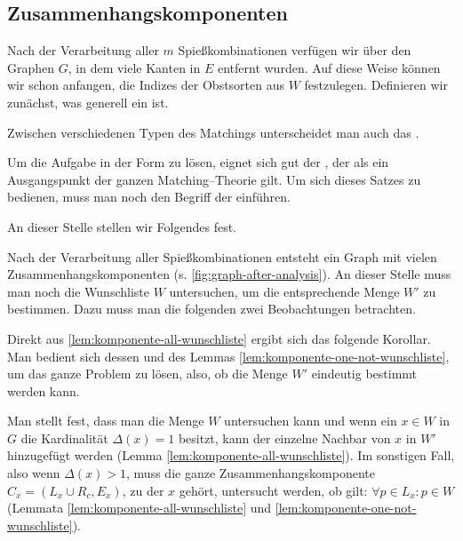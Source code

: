 \subsection{Zusammenhangskomponenten}
Nach der Verarbeitung aller $m$ Spießkombinationen verfügen wir über den Graphen $G$,
in dem viele Kanten in $E$ entfernt wurden.
Auf diese Weise können wir schon anfangen, die Indizes der Obstsorten aus $W$ festzulegen.
Definieren wir zunächst, was generell ein  ist.



Zwischen verschiedenen Typen des Matchings unterscheidet man auch das .



Um die Aufgabe in der Form zu lösen, eignet sich gut der ,
der als ein Ausgangspunkt der ganzen Matching--Theorie gilt. 
Um sich dieses Satzes zu bedienen, muss man noch den Begriff der  einführen.





An dieser Stelle stellen wir Folgendes fest.







Nach der Verarbeitung aller Spießkombinationen entsteht ein Graph mit vielen Zusammenhangskomponenten
(s. \cref{fig:graph-after-analysis}).
An dieser Stelle muss man noch die Wunschliste $W$ untersuchen, um die entsprechende Menge $W'$ zu bestimmen.
Dazu muss man die folgenden zwei Beobachtungen betrachten.





Direkt aus \cref{lem:komponente-all-wunschliste} ergibt sich das folgende Korollar.
Man bedient sich dessen und des Lemmas \ref{lem:komponente-one-not-wunschliste}, um das ganze Problem zu lösen, also, ob die Menge $W'$ eindeutig bestimmt werden kann.



Man stellt fest, dass man die Menge $W$ untersuchen kann und wenn ein $x \in W$ in $G$ die
Kardinalität $\Delta(x) = 1$ besitzt, kann der einzelne Nachbar von $x$ in $W'$ hinzugefügt werden
(Lemma \ref{lem:komponente-all-wunschliste}).
Im sonstigen Fall, also wenn $\Delta(x) > 1$, muss die ganze Zusammenhangskomponente
$C_x = (L_x \cup R_c, E_x)$, zu der $x$ gehört, untersucht werden, ob gilt: $\forall p \in L_x: p \in W$
(Lemmata \ref{lem:komponente-all-wunschliste} und \ref{lem:komponente-one-not-wunschliste}).

